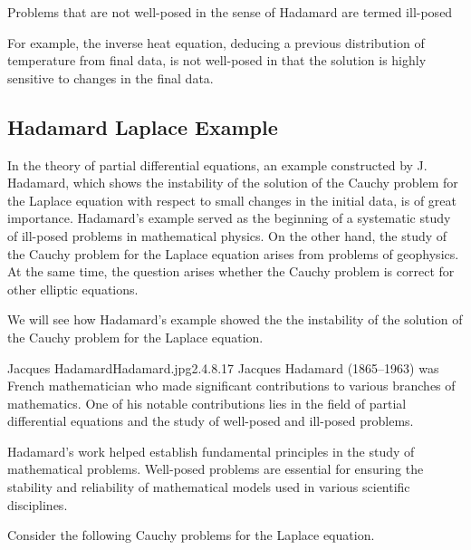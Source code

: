 \documentclass[]{article}
\begin{document}
Problems that are not well-posed in the sense of Hadamard are termed ill-posed

For example, the inverse heat equation, deducing a previous distribution of temperature from final data, is not well-posed in that the solution is highly sensitive to changes in the final data.

\subsection{Hadamard Laplace Example}
In the theory of partial differential equations, an example 
constructed by J. Hadamard, which shows the instability of 
the solution of the Cauchy problem for the Laplace equation 
with respect to small changes in the initial data, is of great importance. 
Hadamard’s example served as the beginning of a 
systematic study of ill-posed problems in mathematical physics. 
On the other hand, the study of the Cauchy problem for 
the Laplace equation arises from problems of geophysics. 
At the same time, the question arises whether the Cauchy problem 
is correct for other elliptic equations. 

We will see how Hadamard’s example showed the the instability of 
the solution of the Cauchy problem for the Laplace equation. 

\begin{figure*}[b]
        \begin{enrichment}{Jacques Hadamard}{Hadamard.jpg}{2.4}{.8}{.17}
        Jacques Hadamard (1865–1963) was French mathematician who made significant contributions 
        to various branches of mathematics. One of his notable contributions lies in the field of 
        partial differential equations and the study of well-posed and ill-posed problems.

        Hadamard's work helped establish fundamental principles in the study of mathematical problems. 
        Well-posed problems are essential for ensuring the stability and reliability of mathematical models
         used in various scientific disciplines.
\end{enrichment}
\end{figure*}
Consider the following Cauchy problems for the Laplace equation.
\end{document}
